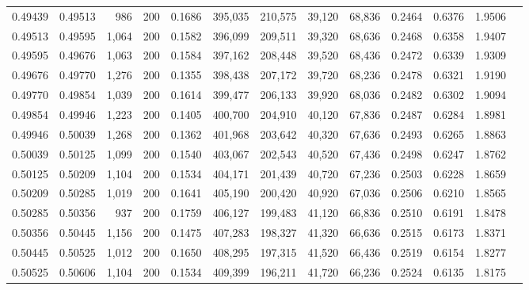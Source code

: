 \begin{tabular}{rrrrrrrrrrrrr}
0.49439 & 0.49513 &   986 & 200 &                                     0.1686 & 395,035 & 210,575 &  39,120 &  68,836 & 0.2464 & 0.6376 & 1.9506 \\
0.49513 & 0.49595 & 1,064 & 200 &                                     0.1582 & 396,099 & 209,511 &  39,320 &  68,636 & 0.2468 & 0.6358 & 1.9407 \\
0.49595 & 0.49676 & 1,063 & 200 &                                     0.1584 & 397,162 & 208,448 &  39,520 &  68,436 & 0.2472 & 0.6339 & 1.9309 \\
0.49676 & 0.49770 & 1,276 & 200 &                                     0.1355 & 398,438 & 207,172 &  39,720 &  68,236 & 0.2478 & 0.6321 & 1.9190 \\
0.49770 & 0.49854 & 1,039 & 200 &                                     0.1614 & 399,477 & 206,133 &  39,920 &  68,036 & 0.2482 & 0.6302 & 1.9094 \\
0.49854 & 0.49946 & 1,223 & 200 &                                     0.1405 & 400,700 & 204,910 &  40,120 &  67,836 & 0.2487 & 0.6284 & 1.8981 \\
0.49946 & 0.50039 & 1,268 & 200 &                                     0.1362 & 401,968 & 203,642 &  40,320 &  67,636 & 0.2493 & 0.6265 & 1.8863 \\
0.50039 & 0.50125 & 1,099 & 200 &                                     0.1540 & 403,067 & 202,543 &  40,520 &  67,436 & 0.2498 & 0.6247 & 1.8762 \\
0.50125 & 0.50209 & 1,104 & 200 &                                     0.1534 & 404,171 & 201,439 &  40,720 &  67,236 & 0.2503 & 0.6228 & 1.8659 \\
0.50209 & 0.50285 & 1,019 & 200 &                                     0.1641 & 405,190 & 200,420 &  40,920 &  67,036 & 0.2506 & 0.6210 & 1.8565 \\
0.50285 & 0.50356 &   937 & 200 &                                     0.1759 & 406,127 & 199,483 &  41,120 &  66,836 & 0.2510 & 0.6191 & 1.8478 \\
0.50356 & 0.50445 & 1,156 & 200 &                                     0.1475 & 407,283 & 198,327 &  41,320 &  66,636 & 0.2515 & 0.6173 & 1.8371 \\
0.50445 & 0.50525 & 1,012 & 200 &                                     0.1650 & 408,295 & 197,315 &  41,520 &  66,436 & 0.2519 & 0.6154 & 1.8277 \\
0.50525 & 0.50606 & 1,104 & 200 &                                     0.1534 & 409,399 & 196,211 &  41,720 &  66,236 & 0.2524 & 0.6135 & 1.8175 \\

\end{tabular}
